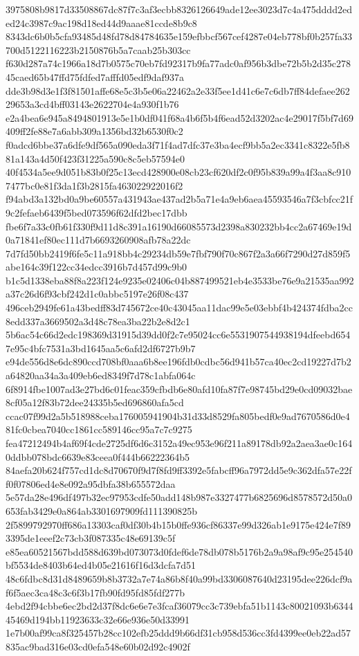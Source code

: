 \documentclass[11pt,a4paper]{article}
\begin{document}
{3975808b9817d33508867dc87f7c3af3ecbb8326126649ade12ee3023d7c4a475dddd2eded24c3987c9ac198d18ed44d9aaae81ccde8b9c8
8343dc6b0b5cfa93485d48fd78d84784635e159efbbcf567cef4287e04eb778bf0b257fa33700d5122116223b2150876b5a7caab25b303cc
f630d287a74c1966a18d7b0575c70eb7fd92317b9fa77adc0af956b3dbe72b5b2d35c27845caed65b47ffd75fdfed7afffd05edf9daf937a
dde3b98d3e1f3f81501affe68e5c3b5e06a22462a2e33f5ee1d41c6e7c6db7ff84defaee26229653a3cd4bff03143e2622704e4a930f1b76
e2a4bea6e945a8494801913e5e1b0df041f68a4b6f5b4f6ead52d3202ac4e29017f5bf7d69409ff2fe88e7a6abb309a1356bd32b6530f0c2
f0adcd6bbe37a6dfe9df565a090eda3f71f4ad7dfc37e3ba4ecf9bb5a2ec3341c8322e5fb881a143a4d50f423f31225a590c8c5eb57594e0
40f4534a5ee9d051b83b0f25c13ecd428900e08cb23cf620df2c0f95b839a99a4f3aa8c9107477bc0e81f3da1f3b2815fa463022922016f2
f94abd3a132bd0a9be60557a431943ae437ad2b5a71e4a9eb6aea45593546a7f3cbfcc21f9c2fefaeb6439f5bed073596f62dfd2bec17dbb
fbe6f7a33c0fb61f330f9d11d8c391a16190d66085573d2398a830232bb4cc2a67469e19d0a71841ef80ec111d7b6693260908afb78a22dc
7d7fd50bb2419f6fe5c11a918bb4c29234db59e7fbf790f70c867f2a3a66f7290d27d859f5abe164c39f122cc34edcc3916b7d457d99c9b0
b1c5d1338eba88f8a223f124e9235e02406c04b887499521eb4e3533be76e9a21535aa992a37c26d6f93cbf242d1c0abbc5197e26f08c437
496ceb2949fe61a43bedff83d745672ce40c43045aa11dac99e5e03ebbf4b424374fdba2cc8edd337a3669502a3d48c78ea3ba22b2e8d2c1
5b6ac54c66d2edc198369d31915d39dd0f2c7e95024cc6e5531907544938194dfeebd6547e95c4bfc7531a3bd1645aa5c6afd2df6727b9b7
e94de556d8e6dc890ccd708bf0aaa6b8ee196fdb0cdbc56d941b57ca40ec2cd19227d7b2a64820aa34a3a409eb6ed8349f7d78c1abfa064c
6f8914fbe1007ad3e27bd6c01feac359cfbdb6e80afd10fa87f7e98745bd29e0cd09032bae8cf05a12f83b72dee24335b5ed696860afa5cd
ccac07f99d2a5b518988ceba176005941904b31d33d8529fa805bedf0e9ad7670586d0e481fc0cbea7040cc1861cc589146cc95a7c7c9275
fea47212494b4af69f4cde2725df6d6c3152a49ec953e96f211a89178db92a2aea3ae0c1640ddbb078bdc6639e83ceea0f444b66222364b5
84aefa20b624f757cd1dc8d70670f9d7f8fd9ff3392e5fabcff96a7972dd5e9c362dfa57e22ff0f07806ed4e8e092a95dbfa38b655572daa
5e57da28e496df497b32ec97953cdfe50add148b987e3327477b6825696d8578572d50a0653fab3429e0a864ab3301697909fd111390825b
2f5899792970ff686a13303caf0df30b4b15b0ffe936cf86337e99d326ab1e9175e424e7f893395de1eeef2c73cb3f087335c48e69139c5f
e85ea60521567bdd588d639bd073073d0fdef6de78db078b5176b2a9a98af9c95e254540bf5534de8403b64ed4b05e21616f16d3dcfa7d51
48c6fdbc8d31d8489659b8b3732a7e74a86b8f40a99bd3306087640d23195dee226dcf9af6f5aec3ca48c3c6f3b17fb90fd95fd85fdf277b
4ebd2f94cbbe6ec2bd2d37f8dc6e6e7e3fcaf36079cc3c739ebfa51b1143c80021093b634445469d194bb11923633c32e66e936e50d33991
1e7b00af99ca8f325457b28cc102efb25ddd9b66df31cb958d536cc3fd4399ee0eb22ad57835ac9bad316e03cd0efa548e60b02d92c4902f
}
\end{document}
